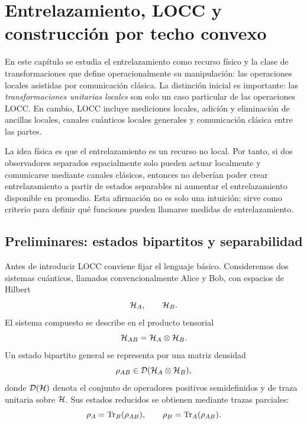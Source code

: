 \documentclass[../main.tex]{subfiles}
\begin{document}
\chapter{Entrelazamiento, LOCC y construcción por techo convexo}
\label{chap:entrelazamiento-locc-techo-convexo}

En este capítulo se estudia el entrelazamiento como recurso físico y la clase de transformaciones que define operacionalmente su manipulación: las operaciones locales asistidas por comunicación clásica. La distinción inicial es importante: las \emph{transformaciones unitarias locales} son solo un caso particular de las operaciones LOCC. En cambio, LOCC incluye mediciones locales, adición y eliminación de ancillas locales, canales cuánticos locales generales y comunicación clásica entre las partes.

La idea física es que el entrelazamiento es un recurso no local. Por tanto, si dos observadores separados espacialmente solo pueden actuar localmente y comunicarse mediante canales clásicos, entonces no deberían poder crear entrelazamiento a partir de estados separables ni aumentar el entrelazamiento disponible en promedio. Esta afirmación no es solo una intuición: sirve como criterio para definir qué funciones pueden llamarse medidas de entrelazamiento.

\section{Preliminares: estados bipartitos y separabilidad}

Antes de introducir LOCC conviene fijar el lenguaje básico. Consideremos dos sistemas cuánticos, llamados convencionalmente Alice y Bob, con espacios de Hilbert
\begin{equation*}
    \mathcal{H}_A,\qquad \mathcal{H}_B.
\end{equation*}
El sistema compuesto se describe en el producto tensorial
\begin{equation*}
    \mathcal{H}_{AB}=\mathcal{H}_A\otimes\mathcal{H}_B.
\end{equation*}
Un estado bipartito general se representa por una matriz densidad
\begin{equation*}
    \rho_{AB}\in\mathcal D(\mathcal{H}_A\otimes\mathcal{H}_B),
\end{equation*}
donde \(\mathcal D(\mathcal{H})\) denota el conjunto de operadores positivos semidefinidos y de traza unitaria sobre \(\mathcal{H}\). Sus estados reducidos se obtienen mediante trazas parciales:
\begin{equation*}
    \rho_A=\Tr_B(\rho_{AB}),
    \qquad
    \rho_B=\Tr_A(\rho_{AB}).
\end{equation*}
\end{document}
